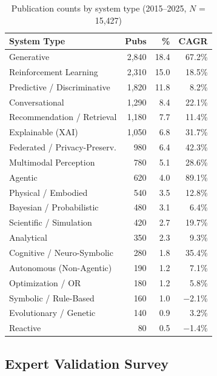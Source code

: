 \documentclass[12pt, a4paper]{article}
\begin{document}
\begin{table}[ht]
  \caption{Publication counts by system type (2015--2025, $N$ = 15,427)}
  \label{tab:publications}
  \begin{tabular}{lrrr}
    \toprule
    \textbf{System Type} & \textbf{Pubs} & \textbf{\%} & \textbf{CAGR} \\
    \midrule
    Generative & 2,840 & 18.4 & 67.2\% \\
    Reinforcement Learning & 2,310 & 15.0 & 18.5\% \\
    Predictive / Discriminative & 1,820 & 11.8 & 8.2\% \\
    Conversational & 1,290 & 8.4 & 22.1\% \\
    Recommendation / Retrieval & 1,180 & 7.7 & 11.4\% \\
    Explainable (XAI) & 1,050 & 6.8 & 31.7\% \\
    Federated / Privacy-Preserv. & 980 & 6.4 & 42.3\% \\
    Multimodal Perception & 780 & 5.1 & 28.6\% \\
    Agentic & 620 & 4.0 & 89.1\% \\
    Physical / Embodied & 540 & 3.5 & 12.8\% \\
    Bayesian / Probabilistic & 480 & 3.1 & 6.4\% \\
    Scientific / Simulation & 420 & 2.7 & 19.7\% \\
    Analytical & 350 & 2.3 & 9.3\% \\
    Cognitive / Neuro-Symbolic & 280 & 1.8 & 35.4\% \\
    Autonomous (Non-Agentic) & 190 & 1.2 & 7.1\% \\
    Optimization / OR & 180 & 1.2 & 5.8\% \\
    Symbolic / Rule-Based & 160 & 1.0 & $-$2.1\% \\
    Evolutionary / Genetic & 140 & 0.9 & 3.2\% \\
    Reactive & 80 & 0.5 & $-$1.4\% \\
    \bottomrule
  \end{tabular}
\end{table}

\subsection{Expert Validation Survey}
\end{document}
